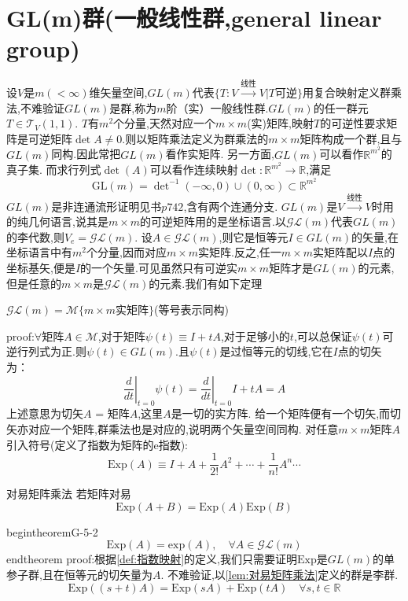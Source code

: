 \documentclass[../main.tex]{subfiles}
\begin{document}
\section{GL(m)群(一般线性群,general linear group)}
设$V$是$m(<\infty)$维矢量空间,$GL(m)$代表$\{T:V\xrightarrow{\text{线性}}V|T\text{可逆}\}$用复合映射定义群乘法,不难验证$GL(m)$是群,称为$m$阶（实）一般线性群.$GL(m)$的任一群元$T\in\mathscr{T}_V(1,1)$.
$T$有$m^2$个分量,天然对应一个$m\times m$(实)矩阵,映射$T$的可逆性要求矩阵是可逆矩阵$\det{A}\ne 0$.则以矩阵乘法定义为群乘法的$m\times m$矩阵构成一个群,且与$GL(m)$同构.因此常把$GL(m)$看作实矩阵.
另一方面,$GL(m)$可以看作$\mathbb{R}^{m^2}$的真子集.
而求行列式$\det(A)$可以看作连续映射$\det:\mathbb{R}^{m^2}\rightarrow \mathbb{R}$,满足
    $$ \text{GL}(m) = \det\nolimits^{-1}(-\infty,0)\cup(0,\infty) \subset \mathbb{R}^{m^2} $$
$GL(m)$是非连通流形证明见书$p742$,含有两个连通分支.
 $GL(m)$是$V\xrightarrow{\text{线性}}V$时用的纯几何语言,说其是$m\times m$的可逆矩阵用的是坐标语言.以$\mathscr{GL}(m)$代表$GL(m)$的李代数,则$V_e = \mathscr{GL}(m)$.
设$A\in \mathscr{GL}{(m)}$,则它是恒等元$I \in GL(m)$的矢量,在坐标语言中有$m^2$个分量,因而对应$m\times m$实矩阵.反之,任一$m\times m$实矩阵配以$I$点的坐标基矢,便是$I$的一个矢量.可见虽然只有可逆实$m\times m$矩阵才是$GL(m)$的元素,但是任意的$m\times m$是$\mathscr{GL}(m)$的元素.我们有如下定理
\begin{theorem}
    $\mathscr{GL}(m) = \mathscr{M}\{m\times m \text{实矩阵}\}$(等号表示同构)
\end{theorem}
   proof:$\forall$矩阵$A\in \mathscr{M}$,对于矩阵$\psi(t)\equiv I + tA$,对于足够小的$t$,可以总保证$\psi(t)$可逆行列式为正.则$\psi(t) \in GL(m)$.且$\psi(t)$是过恒等元的切线,它在$I$点的切矢为：
$$
\left.\frac{d}{dt}\right|_{t=0}\psi(t) = \left.\frac{d}{dt}\right|_{t=0}I + tA = A
$$
上述意思为切矢$A$ = 矩阵$A$,这里$A$是一切的实方阵.
给一个矩阵便有一个切矢,而切矢亦对应一个矩阵,群乘法也是对应的,说明两个矢量空间同构.
对任意$m\times m$矩阵$A$引入符号(定义了指数为矩阵的e指数):
    $$ \text{Exp}(A)\equiv I + A + \frac{1}{2!}A^2 +\cdots+\frac{1}{n!}A^n\cdots $$
\begin{lemma}{}{对易矩阵乘法}
   若矩阵对易
    $$ \text{Exp}(A+B)= \text{Exp}(A)\text{Exp}(B) $$
\end{lemma}
begin{theorem}{}{G-5-2}	$$ \text{Exp}(A) = \text{exp}(A),\quad\forall A \in \mathscr{GL}(m) $$
end{theorem}
proof:根据\ref{def:指数映射}的定义,我们只需要证明$\text{Exp}$是$GL(m)$的单参子群,且在恒等元的切矢量为$A$.
    不难验证,以\ref{lem:对易矩阵乘法}定义的群是李群.
    $$ \text{Exp}((s+t)A) = \text{Exp}(sA) + \text{Exp}(tA) \quad \forall s,t \in \mathbb{R}$$
\end{document}
